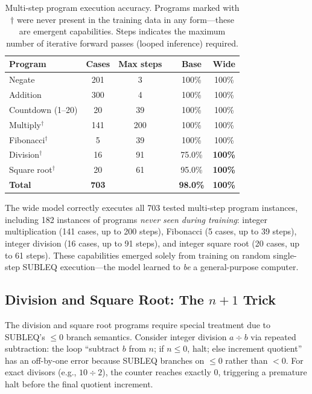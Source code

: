 \documentclass[11pt,a4paper]{article}
\begin{document}
\begin{table}[h]
\centering
\caption{Multi-step program execution accuracy. Programs marked with $\dagger$ were never present in the training data in any form---these are emergent capabilities. Steps indicates the maximum number of iterative forward passes (looped inference) required.}
\label{tab:multistep}
\begin{tabular}{lccrcc}
\toprule
\textbf{Program} & \textbf{Cases} & \textbf{Max steps} & & \textbf{Base} & \textbf{Wide} \\
\midrule
Negate & 201 & 3 && 100\% & 100\% \\
Addition & 300 & 4 && 100\% & 100\% \\
Countdown (1--20) & 20 & 39 && 100\% & 100\% \\
Multiply$^\dagger$ & 141 & 200 && 100\% & 100\% \\
Fibonacci$^\dagger$ & 5 & 39 && 100\% & 100\% \\
Division$^\dagger$ & 16 & 91 && 75.0\% & \textbf{100\%} \\
Square root$^\dagger$ & 20 & 61 && 95.0\% & \textbf{100\%} \\
\midrule
\textbf{Total} & \textbf{703} & && \textbf{98.0\%} & \textbf{100\%} \\
\bottomrule
\end{tabular}
\end{table}

\begin{finding}
The wide model correctly executes all 703 tested multi-step program instances, including 182 instances of programs \emph{never seen during training}: integer multiplication (141 cases, up to 200 steps), Fibonacci (5 cases, up to 39 steps), integer division (16 cases, up to 91 steps), and integer square root (20 cases, up to 61 steps).
These capabilities emerged solely from training on random single-step SUBLEQ execution---the model learned to \emph{be} a general-purpose computer.
\end{finding}

\subsection{Division and Square Root: The $n{+}1$ Trick}
\label{sec:nplusone}

The division and square root programs require special treatment due to SUBLEQ's $\leq 0$ branch semantics.
Consider integer division $a \div b$ via repeated subtraction: the loop ``subtract $b$ from $n$; if $n \leq 0$, halt; else increment quotient'' has an off-by-one error because SUBLEQ branches on $\leq 0$ rather than $< 0$.
For exact divisors (e.g., $10 \div 2$), the counter reaches exactly 0, triggering a premature halt before the final quotient increment.
\end{document}
